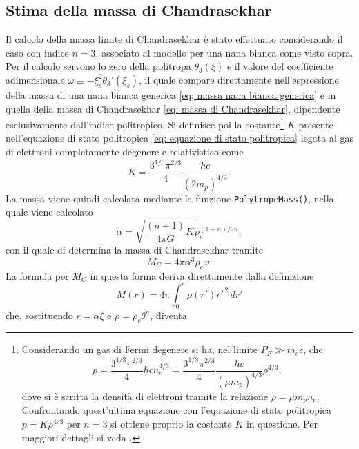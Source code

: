 \documentclass{article}
\numberwithin{equation}{section}
\begin{document}
\subsection{Stima della massa di Chandrasekhar}
Il calcolo della massa limite di Chandrasekhar è stato effettuato considerando il caso con indice $n = 3$, associato al modello per una nana bianca come visto sopra. Per il calcolo servono lo zero della politropa $\theta_3(\xi)$ e il valore del coefficiente adimensionale $\omega \equiv -\xi_s^2\theta_3'(\xi_s)$, il quale compare direttamente nell'espressione della massa di una nana bianca generica \eqref{eq; massa nana bianca generica} e in quella della massa di Chandrasekhar \eqref{eq: massa di Chandrasekhar}, dipendente esclusivamente dall'indice politropico. Si definisce poi la costante\footnote{Considerando un gas di Fermi degenere si ha, nel limite $P_F \gg m_ec$, che 
\begin{equation}
    p = \frac{3^{1/3}\pi^{2/3}}{4}\hbar c n_e^{4/3} = \frac{3^{1/3}\pi^{2/3}}{4}\frac{\hbar c}{(\mu m_p)^{4/3}}\rho^{4/3},
\end{equation}
dove si è scritta la densità di elettroni tramite la relazione $\rho = \mu m_p n_e$. Confrontando quest'ultima equazione con l'equazione di stato politropica $p = K\rho^{4/3}$ per $n = 3$ si ottiene proprio la costante $K$ in questione. Per maggiori dettagli si veda \cite[pg.~2,pg.~5]{chavanis2007}.} $K$ presente nell'equazione di stato politropica \eqref{eq: equazione di stato politropica} legata al gas di elettroni completamente degenere e relativistico come
\begin{equation}
    K = \frac{3^{1/3}\pi^{2/3}}{4}\frac{\hbar c}{(2m_p)^{4/3}}.
\end{equation}
La massa viene quindi calcolata mediante la funzione \texttt{PolytropeMass()}, nella quale viene calcolato
\begin{equation}
    \alpha = \sqrt{\frac{(n + 1)}{4\pi G}K}\rho_c^{(1 - n)/2n},
\end{equation}
con il quale di determina la massa di Chandrasekhar tramite
\begin{equation}
\label{eq: massa di Chandrasekhar in funzione di alpha}
    M_C = 4\pi \alpha^3\rho_c \omega.
\end{equation}
La formula per $M_C$ in questa forma deriva direttamente dalla definizione
\begin{equation}
    M(r) = 4\pi\int_0^r\rho(r')r'^{\,2}\,dr'
\end{equation}
che, sostituendo $r = \alpha\xi$ e $\rho = \rho_c\theta^n$, diventa
\end{document}
